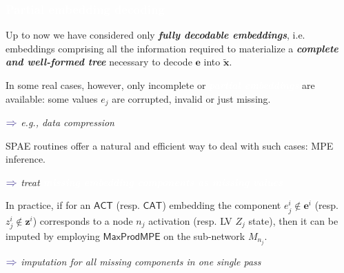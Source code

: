 \documentclass[xcolor={usenames,dvipsnames,svgnames}, compress]{beamer}
\newcommand{\highlighttext}[2][yellow]{{\colorbox{#1}{\textcolor{white}{#2}}}}
\begin{document}
\begin{frame}[t]
  \frametitle{\highlighttext[bgrey4]{Partial embedding decoding}}
  \footnotesize

  Up to now we have considered only \textbf{\emph{fully decodable embeddings}},
i.e. embeddings comprising all the information required to materialize a
\textbf{\emph{complete and well-formed 
tree}} necessary to decode $\mathbf{e}$ into $\tilde{\mathbf{x}}$.\par
%
In some real cases, however, only incomplete
or \highlighttext[tomato0]{\textbf{\emph{partial embeddings}}} are available: some
values $e_{j}$ are corrupted, invalid or just missing.
\begin{minipage}{1.0\linewidth}
      \raggedleft
      $\color{violet}\boldsymbol\Rightarrow$
      \scriptsize
     \emph{e.g., data compression}
   \end{minipage}\par\bigskip

SPAE routines offer a natural and efficient way to deal with such
cases: MPE inference.
\begin{minipage}{1.0\linewidth}
      \raggedleft
      $\color{violet}\boldsymbol\Rightarrow$
      \scriptsize
     \emph{treat \highlighttext[tomato0]{\emph{\textbf{missing embedding components as missing values}}}}
   \end{minipage}\par\bigskip


%
%

In practice, if for an $\mathsf{ACT}$ (resp. $\mathsf{CAT}$) embedding
the component $e_{j}^{i}\notin \mathbf{e}^{i}$ (resp. $z_{j}^{i}\notin \mathbf{z}^{i}$) 
corresponds to a node $n_{j}$ activation (resp. LV $Z_{j}$ state),
then it can be imputed
by employing
$\mathsf{MaxProdMPE}$ on the sub-network $M_{n_{j}}$.
\begin{minipage}{1.0\linewidth}
      \raggedleft
      $\color{violet}\boldsymbol\Rightarrow$
      \scriptsize
     \emph{imputation for all missing components in one single pass}
   \end{minipage}\par\bigskip

   
\end{frame}
\end{document}

